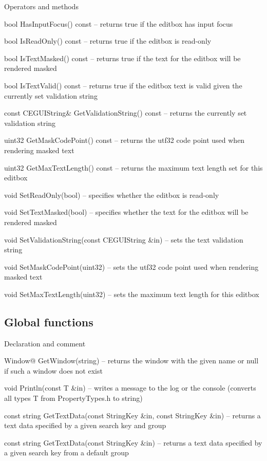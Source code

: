 \begin{titled-itemize}{Operators and methods}
  \item bool HasInputFocus() const -- returns true if the editbox has input focus
  \item bool IsReadOnly() const -- returns true if the editbox is read-only
  \item bool IsTextMasked() const -- returns true if the text for the editbox will be rendered masked
  \item bool IsTextValid() const -- returns true if the editbox text is valid given the currently set
 validation string
  \item const CEGUIString\& GetValidationString() const -- returns the currently set validation string
  \item uint32 GetMaskCodePoint() const -- returns the utf32 code point used when rendering masked text
  \item uint32 GetMaxTextLength() const -- returns the maximum text length set for this editbox
  \item void SetReadOnly(bool) -- specifies whether the editbox is read-only
  \item void SetTextMasked(bool) -- specifies whether the text for the editbox will be rendered masked
  \item void SetValidationString(const CEGUIString \&in) -- sets the text validation string
  \item void SetMaskCodePoint(uint32) -- sets the utf32 code point used when rendering masked text
  \item void SetMaxTextLength(uint32) -- sets the maximum text length for this editbox
\end{titled-itemize}

\subsection{Global functions}

\begin{titled-itemize}{Declaration and comment}
  \item Window@ GetWindow(string) -- returns the window with the given name or null if such a window does not exist
  \item void Println(const T \&in) -- writes a message to the log or the console (converts all types T from PropertyTypes.h to string)
  \item const string GetTextData(const StringKey \&in, const StringKey \&in) -- returns a text data specified by a given search key and group
  \item const string GetTextData(const StringKey \&in) -- returns a text data specified by a given search key from a default group
\end{titled-itemize}


